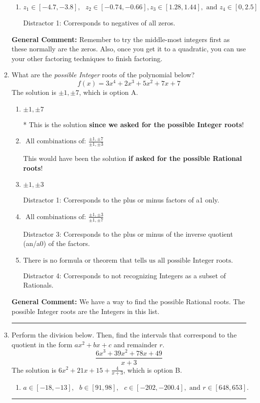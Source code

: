\documentclass{extbook}[14pt]
\newcommand{\litem}[1]{\item #1

\rule{\textwidth}{0.4pt}}
\begin{document}
\begin{enumerate}
{\begin{enumerate}[label=\Alph*.]
 Distractor 3: Corresponds to negatives of all zeros AND inversing rational roots.
\item \( z_1 \in [-4.7, -3.8], \text{   }  z_2 \in [-0.74, -0.66], z_3 \in [1.28, 1.44], \text{   and   } z_4 \in [0, 2.5] \)

 Distractor 1: Corresponds to negatives of all zeros.
\end{enumerate}

\textbf{General Comment:} Remember to try the middle-most integers first as these normally are the zeros. Also, once you get it to a quadratic, you can use your other factoring techniques to finish factoring.
}
\litem{
What are the \textit{possible Integer} roots of the polynomial below?
\[ f(x) = 3x^{4} +2 x^{3} +5 x^{2} +7 x + 7 \]The solution is \( \pm 1,\pm 7 \), which is option A.\begin{enumerate}[label=\Alph*.]
\item \( \pm 1,\pm 7 \)

* This is the solution \textbf{since we asked for the possible Integer roots}!
\item \( \text{ All combinations of: }\frac{\pm 1,\pm 7}{\pm 1,\pm 3} \)

This would have been the solution \textbf{if asked for the possible Rational roots}!
\item \( \pm 1,\pm 3 \)

 Distractor 1: Corresponds to the plus or minus factors of a1 only.
\item \( \text{ All combinations of: }\frac{\pm 1,\pm 3}{\pm 1,\pm 7} \)

 Distractor 3: Corresponds to the plus or minus of the inverse quotient (an/a0) of the factors. 
\item \( \text{There is no formula or theorem that tells us all possible Integer roots.} \)

 Distractor 4: Corresponds to not recognizing Integers as a subset of Rationals.
\end{enumerate}

\textbf{General Comment:} We have a way to find the possible Rational roots. The possible Integer roots are the Integers in this list.
}
\litem{
Perform the division below. Then, find the intervals that correspond to the quotient in the form $ax^2+bx+c$ and remainder $r$.
\[ \frac{6x^{3} +39 x^{2} +78 x + 49}{x + 3} \]The solution is \( 6x^{2} +21 x + 15 + \frac{4}{x + 3} \), which is option B.\begin{enumerate}[label=\Alph*.]
\item \( a \in [-18, -13], \text{   } b \in [91, 98], \text{   } c \in [-202, -200.4], \text{   and   } r \in [648, 653]. \)


\end{enumerate}}
\end{enumerate}
\end{document}

